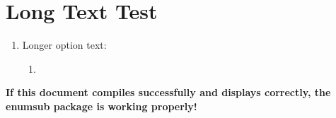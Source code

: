\documentclass{article}
\begin{document}
\section{Long Text Test}

\begin{enumerate}
  \item Longer option text:
  \begin{enumerate}
    \item {}
  \end{enumerate}
\end{enumerate}

\textbf{If this document compiles successfully and displays correctly, the enumsub package is working properly!}
\end{document}
